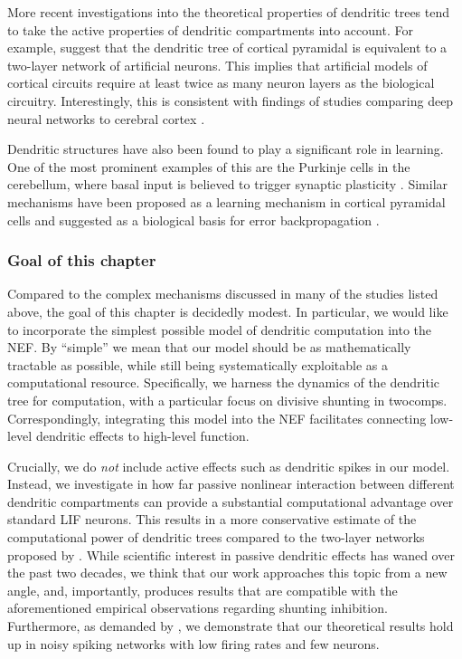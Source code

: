 More recent investigations into the theoretical properties of dendritic trees tend to take the active properties of dendritic compartments into account.
For example, \citet{poirazi2003pyramidal} suggest that the dendritic tree of cortical pyramidal is equivalent to a two-layer network of artificial neurons.
This implies that artificial models of cortical circuits require at least twice as many neuron layers as the biological circuitry.
Interestingly, this is consistent with findings of studies comparing deep neural networks to cerebral cortex \citep[e.g.,][]{guclu2015deep}.

Dendritic structures have also been found to play a significant role in learning.
One of the most prominent examples of this are the Purkinje cells in the cerebellum, where basal input is believed to trigger synaptic plasticity \citep{fujita1982adaptive,ito2010cerebellar}.
Similar mechanisms have been proposed as a learning mechanism in cortical pyramidal cells and suggested as a biological basis for error backpropagation \citep{richards2019dendritic,richards2019deep}.

\subsubsection{Goal of this chapter}
Compared to the complex mechanisms discussed in many of the studies listed above, the goal of this chapter is decidedly modest.
In particular, we would like to incorporate the simplest possible model of dendritic computation into the NEF.
By \enquote{simple} we mean that our model should be as mathematically tractable as possible, while still being systematically exploitable as a computational resource.
Specifically, we harness the dynamics of the dendritic tree for computation, with a particular focus on divisive shunting in \glspl{twocomp}.
Correspondingly, integrating this model into the NEF facilitates connecting low-level dendritic effects to high-level function.

Crucially, we do \emph{not} include active effects such as dendritic spikes in our model.
Instead, we investigate in how far passive nonlinear interaction between different dendritic compartments can provide a substantial computational advantage over standard LIF neurons.
This results in a more conservative estimate of the computational power of dendritic trees compared to the two-layer networks proposed by \citet{poirazi2003pyramidal}.
While scientific interest in passive dendritic effects has waned over the past two decades, we think that our work approaches this topic from a new angle, and, importantly, produces results that are compatible with the aforementioned empirical observations regarding shunting inhibition.
Furthermore, as demanded by \citet{london2005dendritic}, we demonstrate that our theoretical results hold up in noisy spiking networks with low firing rates and few neurons.

